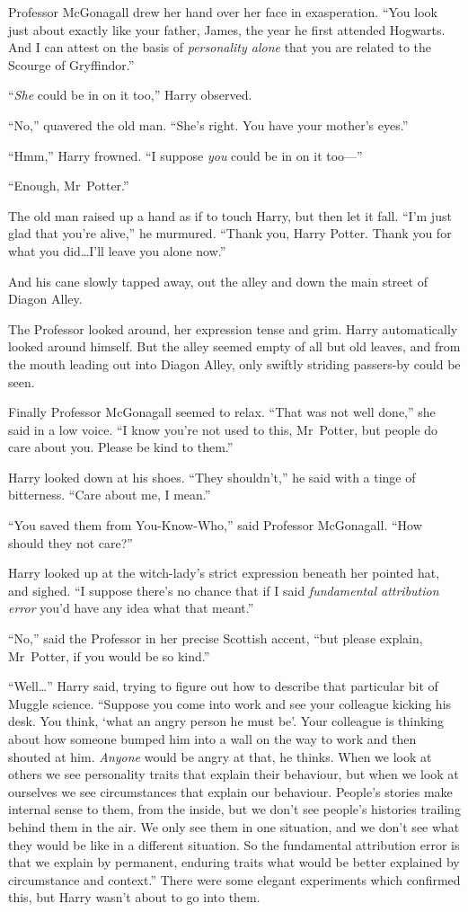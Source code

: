 Professor McGonagall drew her hand over her face in exasperation.
“You look just about exactly like your father, James, the year he first attended Hogwarts. And I can attest on the basis of \emph{personality alone} that you are related to the Scourge of Gryffindor.”

“\emph{She} could be in on it too,” Harry observed.

“No,” quavered the old man.
“She’s right. You have your mother’s eyes.”

“Hmm,” Harry frowned.
“I suppose \emph{you} could be in on it too—”

“Enough, Mr~Potter.”

The old man raised up a hand as if to touch Harry, but then let it fall.
“I’m just glad that you’re alive,” he murmured.
“Thank you, Harry Potter. Thank you for what you did…I’ll leave you alone now.”

And his cane slowly tapped away, out the alley and down the main street of Diagon Alley.

The Professor looked around, her expression tense and grim. Harry automatically looked around himself. But the alley seemed empty of all but old leaves, and from the mouth leading out into Diagon Alley, only swiftly striding passers-by could be seen.

Finally Professor McGonagall seemed to relax.
“That was not well done,” she said in a low voice.
“I know you’re not used to this, Mr~Potter, but people do care about you. Please be kind to them.”

Harry looked down at his shoes.
“They shouldn’t,” he said with a tinge of bitterness.
“Care about me, I mean.”

“You saved them from You-Know-Who,” said Professor McGonagall.
“How should they not care?”

Harry looked up at the witch-lady’s strict expression beneath her pointed hat, and sighed.
“I suppose there’s no chance that if I said \emph{fundamental attribution error} you’d have any idea what that meant.”

“No,” said the Professor in her precise Scottish accent, “but please explain, Mr~Potter, if you would be so kind.”

“Well…” Harry said, trying to figure out how to describe that particular bit of Muggle science.
“Suppose you come into work and see your colleague kicking his desk. You think, ‘what an angry person he must be’. Your colleague is thinking about how someone bumped him into a wall on the way to work and then shouted at him. \emph{Anyone} would be angry at that, he thinks. When we look at others we see personality traits that explain their behaviour, but when we look at ourselves we see circumstances that explain our behaviour. People’s stories make internal sense to them, from the inside, but we don’t see people’s histories trailing behind them in the air. We only see them in one situation, and we don’t see what they would be like in a different situation. So the fundamental attribution error is that we explain by permanent, enduring traits what would be better explained by circumstance and context.” There were some elegant experiments which confirmed this, but Harry wasn’t about to go into them.

